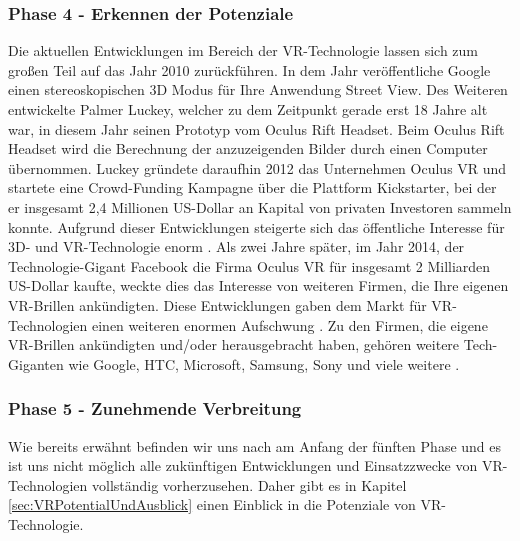 \subsubsection{Phase 4 - Erkennen der Potenziale}
Die aktuellen Entwicklungen im Bereich der VR-Technologie lassen sich zum großen Teil auf das Jahr 2010 zurückführen.
\newline
In dem Jahr veröffentliche Google einen stereoskopischen 3D Modus für Ihre Anwendung Street View. Des Weiteren entwickelte Palmer Luckey, welcher zu dem Zeitpunkt gerade erst 18 Jahre alt war, in diesem Jahr seinen Prototyp vom Oculus Rift Headset. Beim Oculus Rift Headset wird die Berechnung der anzuzeigenden Bilder durch einen Computer übernommen. Luckey gründete daraufhin 2012 das Unternehmen Oculus VR und startete eine Crowd-Funding Kampagne über die Plattform Kickstarter, bei der er insgesamt 2,4 Millionen US-Dollar an Kapital von privaten Investoren sammeln konnte. Aufgrund dieser Entwicklungen steigerte sich das öffentliche Interesse für 3D- und VR-Technologie enorm \cite{20}.
\newline
Als zwei Jahre später, im Jahr 2014, der Technologie-Gigant Facebook die Firma Oculus VR für insgesamt 2 Milliarden US-Dollar kaufte, weckte dies das Interesse von weiteren Firmen, die Ihre eigenen VR-Brillen ankündigten. Diese Entwicklungen gaben dem Markt für VR-Technologien einen weiteren enormen Aufschwung \cite{20}.
\newline
Zu den Firmen, die eigene VR-Brillen ankündigten und/oder herausgebracht haben, gehören weitere Tech-Giganten wie Google, HTC, Microsoft, Samsung, Sony und viele weitere \cite{20}.

\subsubsection{Phase 5 - Zunehmende Verbreitung}
Wie bereits erwähnt befinden wir uns nach am Anfang der fünften Phase und es ist uns nicht möglich alle zukünftigen Entwicklungen und Einsatzzwecke von VR-Technologien vollständig vorherzusehen. Daher gibt es in Kapitel \ref{sec:VRPotentialUndAusblick} einen Einblick in die Potenziale von VR-Technologie.

